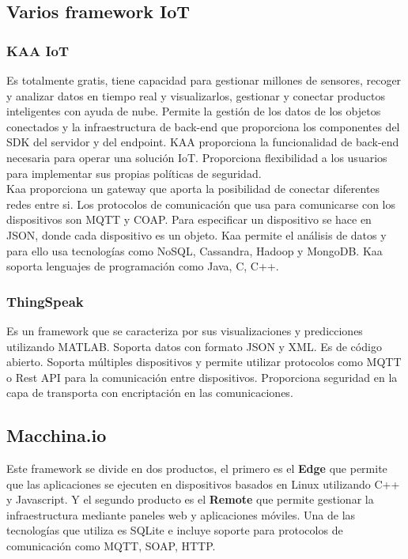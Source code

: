 {\subsection{Varios framework IoT}

\subsubsection{KAA IoT}
    Es totalmente gratis, tiene capacidad para gestionar millones de sensores, recoger y analizar datos en tiempo real y visualizarlos, gestionar y conectar productos inteligentes con ayuda de nube. Permite la gestión de los datos de los objetos conectados y la infraestructura de back-end que proporciona los componentes del SDK del servidor y del endpoint. KAA proporciona la funcionalidad de back-end necesaria para operar una solución IoT. Proporciona flexibilidad a los usuarios para implementar sus propias políticas de seguridad.\\ 
    
    Kaa proporciona un gateway que aporta la posibilidad de conectar diferentes redes entre si. Los protocolos de comunicación que usa para comunicarse con los dispositivos son MQTT y COAP. Para especificar un dispositivo se hace en JSON, donde cada dispositivo es un objeto. Kaa permite el análisis de datos y para ello usa tecnologías como NoSQL, Cassandra, Hadoop y MongoDB. Kaa soporta lenguajes de programación como Java, C, C++. \cite{kaaiot}
    
\subsubsection{ThingSpeak}

Es un framework que se caracteriza por sus visualizaciones y predicciones utilizando MATLAB. Soporta datos con formato JSON y XML. Es de código abierto. Soporta múltiples dispositivos y permite utilizar protocolos como MQTT o Rest API para la comunicación entre dispositivos. Proporciona seguridad en la capa de transporta con encriptación en las comunicaciones. \cite{thingspeak}

\subsection{Macchina.io}

Este framework se divide en dos productos, el primero es el \textbf{Edge} que permite que las aplicaciones se ejecuten en dispositivos basados en Linux utilizando C++ y Javascript. Y el segundo producto es el \textbf{Remote} que permite gestionar la infraestructura mediante paneles web y aplicaciones móviles. Una de las tecnologías que utiliza es SQLite e incluye soporte para protocolos de comunicación como MQTT, SOAP, HTTP. \cite{macchinaio}

}
